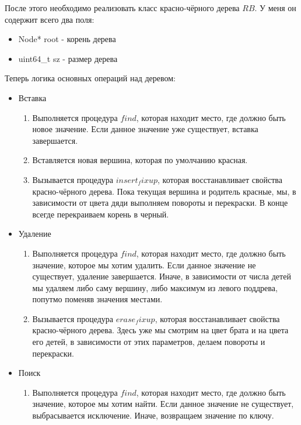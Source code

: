 После этого необходимо реализовать класс красно-чёрного дерева $RB$. У меня он содержит всего два поля:
\begin{itemize}
  \item Node* root - корень дерева
  \item uint64\_t sz - размер дерева
\end{itemize}

Теперь логика основных операций над деревом:
\begin{itemize}
  \item Вставка
    \begin{enumerate} 
      \item Выполняется процедура $find$, которая находит место, где должно быть новое значение. Если данное значение уже существует, вставка завершается.
      \item Вставляется новая вершина, которая по умолчанию красная.
      \item Вызывается процедура $insert_fixup$, которая восстанавливает свойства красно-чёрного дерева. Пока текущая вершина и родитель красные, мы, в зависимости от цвета дяди выполняем повороты и перекраски. В конце всегде перекраиваем корень в черный.
    \end{enumerate}
  \item Удаление
    \begin{enumerate}
      \item Выполняется процедура $find$, которая находит место, где должно быть значение, которое мы хотим удалить. Если данное значение не существует, удаление завершается. Иначе, в зависимости от числа детей мы удаляем либо саму вершину, либо максимум из левого поддрева, попутмо поменяв значения местами.
      \item Вызывается процедура $erase_fixup$, которая восстанавливает свойства красно-чёрного дерева. Здесь уже мы смотрим на цвет брата и на цвета его детей, в зависимости от этих параметров, делаем повороты и перекраски.
    \end{enumerate}
  \item Поиск
    \begin{enumerate}
      \item Выполняется процедура $find$, которая находит место, где должно быть значение, которое мы хотим найти. Если данное значение не существует, выбрасывается исключение. Иначе, возвращаем значение по ключу.
    \end{enumerate}
\end{itemize}

